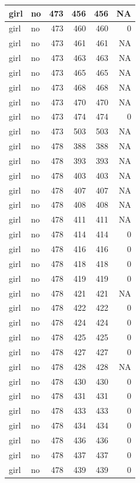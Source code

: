 \documentclass[man]{apa6}
\begin{document}
\begin{tabular}{l|l|r|r|r|r}
\hline
girl & no & 473 & 456 & 456 & NA\\
\hline
girl & no & 473 & 460 & 460 & 0\\
\hline
girl & no & 473 & 461 & 461 & NA\\
\hline
girl & no & 473 & 463 & 463 & NA\\
\hline
girl & no & 473 & 465 & 465 & NA\\
\hline
girl & no & 473 & 468 & 468 & NA\\
\hline
girl & no & 473 & 470 & 470 & NA\\
\hline
girl & no & 473 & 474 & 474 & 0\\
\hline
girl & no & 473 & 503 & 503 & NA\\
\hline
girl & no & 478 & 388 & 388 & NA\\
\hline
girl & no & 478 & 393 & 393 & NA\\
\hline
girl & no & 478 & 403 & 403 & NA\\
\hline
girl & no & 478 & 407 & 407 & NA\\
\hline
girl & no & 478 & 408 & 408 & NA\\
\hline
girl & no & 478 & 411 & 411 & NA\\
\hline
girl & no & 478 & 414 & 414 & 0\\
\hline
girl & no & 478 & 416 & 416 & 0\\
\hline
girl & no & 478 & 418 & 418 & 0\\
\hline
girl & no & 478 & 419 & 419 & 0\\
\hline
girl & no & 478 & 421 & 421 & NA\\
\hline
girl & no & 478 & 422 & 422 & 0\\
\hline
girl & no & 478 & 424 & 424 & 0\\
\hline
girl & no & 478 & 425 & 425 & 0\\
\hline
girl & no & 478 & 427 & 427 & 0\\
\hline
girl & no & 478 & 428 & 428 & NA\\
\hline
girl & no & 478 & 430 & 430 & 0\\
\hline
girl & no & 478 & 431 & 431 & 0\\
\hline
girl & no & 478 & 433 & 433 & 0\\
\hline
girl & no & 478 & 434 & 434 & 0\\
\hline
girl & no & 478 & 436 & 436 & 0\\
\hline
girl & no & 478 & 437 & 437 & 0\\
\hline
girl & no & 478 & 439 & 439 & 0\\

\end{tabular}
\end{document}
